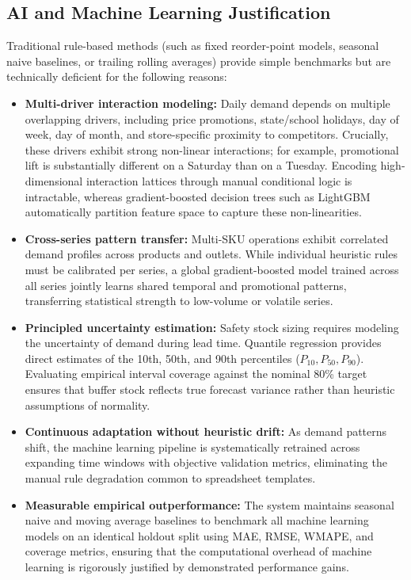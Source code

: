 \documentclass[11pt,a4paper]{article}
\begin{document}
\subsection{AI and Machine Learning Justification}
Traditional rule-based methods (such as fixed reorder-point models, seasonal naive baselines, or trailing rolling averages) provide simple benchmarks but are technically deficient for the following reasons:
\begin{itemize}
    \item \textbf{Multi-driver interaction modeling:} Daily demand depends on multiple overlapping drivers, including price promotions, state/school holidays, day of week, day of month, and store-specific proximity to competitors. Crucially, these drivers exhibit strong non-linear interactions; for example, promotional lift is substantially different on a Saturday than on a Tuesday. Encoding high-dimensional interaction lattices through manual conditional logic is intractable, whereas gradient-boosted decision trees such as LightGBM \cite{ke2017lightgbm} automatically partition feature space to capture these non-linearities.
    \item \textbf{Cross-series pattern transfer:} Multi-SKU operations exhibit correlated demand profiles across products and outlets. While individual heuristic rules must be calibrated per series, a global gradient-boosted model trained across all series jointly learns shared temporal and promotional patterns, transferring statistical strength to low-volume or volatile series.
    \item \textbf{Principled uncertainty estimation:} Safety stock sizing requires modeling the uncertainty of demand during lead time. Quantile regression provides direct estimates of the 10th, 50th, and 90th percentiles ($P_{10}, P_{50}, P_{90}$). Evaluating empirical interval coverage against the nominal 80\% target ensures that buffer stock reflects true forecast variance rather than heuristic assumptions of normality.
    \item \textbf{Continuous adaptation without heuristic drift:} As demand patterns shift, the machine learning pipeline is systematically retrained across expanding time windows with objective validation metrics, eliminating the manual rule degradation common to spreadsheet templates.
    \item \textbf{Measurable empirical outperformance:} The system maintains seasonal naive and moving average baselines to benchmark all machine learning models on an identical holdout split using MAE, RMSE, WMAPE, and coverage metrics, ensuring that the computational overhead of machine learning is rigorously justified by demonstrated performance gains.
\end{itemize}
\end{document}
